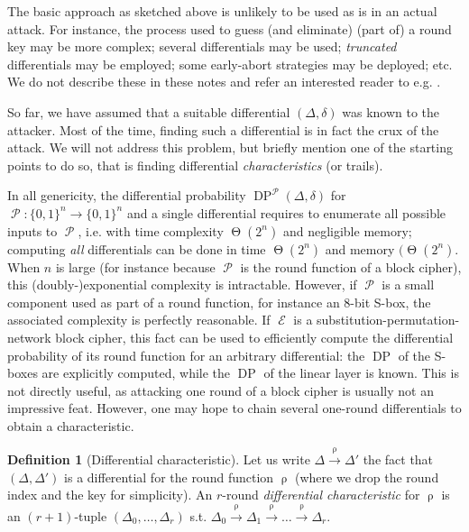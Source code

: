 \documentclass[11pt,a4paper]{article}
\theoremstyle{definition}
\newtheorem{defi}{Definition}
\theoremstyle{theorem}
\DeclareMathOperator\E{\mathcal{E}}
\DeclareMathOperator\Perm{\mathcal{P}}
\DeclareMathOperator\tighto{\Theta}
\DeclareMathOperator\rf{\rho}
\DeclareMathOperator\DP{\mathrm{DP}}
\newcommand\msb{\{0,1\}^n}
\newcommand\charac{\xrightarrow{{\scriptscriptstyle\rf}}}
\begin{document}
The basic approach as sketched above is unlikely to be used as is in an actual attack. For instance, the process used to guess (and eliminate) (part of)
a round key may be more complex; several differentials may be used; \emph{truncated} differentials may be employed; some early-abort strategies may
be deployed; etc. We do not describe these in these notes and refer an interested reader to e.g. \cite{DBLP:books/daglib/0028270,DBLP:conf/sacrypt/Dinur14}.

\medskip

So far, we have assumed that a suitable differential $(\Delta,\delta)$ was known to the attacker. Most of the time, finding such a differential
is in fact the crux of the attack. We will not address this problem, but briefly mention one of the starting points to do so, that is finding
differential \emph{characteristics} (or trails).

In all genericity, the differential probability $\DP^{\Perm}(\Delta,\delta)$ for $\Perm : \msb \rightarrow \msb$ and a
single differential requires to enumerate all possible inputs to $\Perm$, i.e.
with time complexity $\tighto(2^n)$ and negligible memory; computing \emph{all} differentials can be done in time $\tighto(2^n)$ and
memory $(\tighto(2^n)$. When $n$ is large (for instance because $\Perm$ is the round function of a block cipher), this (doubly-)exponential
complexity is intractable. However, if $\Perm$ is a small component used as part of a round function, for instance an 8-bit S-box, the associated
complexity is perfectly reasonable. If $\E$ is a substitution-permutation-network block cipher, this fact can be used to efficiently compute
the differential probability of its round function for an arbitrary differential: the $\DP$ of the S-boxes are explicitly computed, while the
$\DP$ of the linear layer is known. This is not directly useful, as attacking one round of a block cipher
is usually not an impressive feat. However, one may hope to chain several one-round differentials to obtain a characteristic.

\begin{defi}[Differential characteristic]
Let us write $\Delta \charac \Delta'$ the fact that $(\Delta,\Delta')$ is a differential for the round function $\rf$ (where we drop the round
index and the key for simplicity). An $r$-round \emph{differential characteristic} for $\rf$ is an $(r+1)$-tuple
$(\Delta_0,\ldots,\Delta_r)$ s.t. $\Delta_0 \charac \Delta_1 \charac \ldots \charac \Delta_r$. 
\end{defi}
\end{document}
